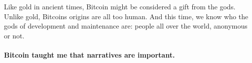 Like gold in ancient times, Bitcoin might be considered a gift from the
gods. Unlike gold, Bitcoins origins are all too human. And this time, we
know who the gods of development and maintenance are: people all over
the world, anonymous or not.

\paragraph{Bitcoin taught me that narratives are important.}

%
%
%
%
